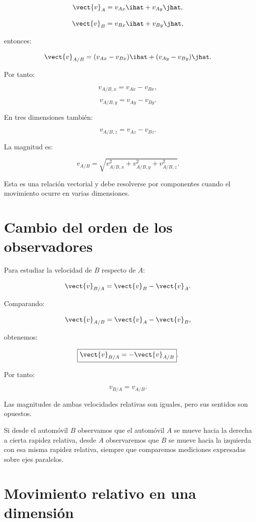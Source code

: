 \[
\vect{v}_A=v_{Ax}\ihat+v_{Ay}\jhat,
\]

\[
\vect{v}_B=v_{Bx}\ihat+v_{By}\jhat,
\]

entonces:

\[
\vect{v}_{A/B}
=
(v_{Ax}-v_{Bx})\ihat
+
(v_{Ay}-v_{By})\jhat.
\]

Por tanto:

\[
\boxed{
v_{A/B,x}=v_{Ax}-v_{Bx}
},
\]

\[
\boxed{
v_{A/B,y}=v_{Ay}-v_{By}
}.
\]

En tres dimensiones también:

\[
\boxed{
v_{A/B,z}=v_{Az}-v_{Bz}
}.
\]

La magnitud es:

\[
\boxed{
v_{A/B}
=
\sqrt{
v_{A/B,x}^2+
v_{A/B,y}^2+
v_{A/B,z}^2
}
}.
\]

Esta es una relación vectorial y debe resolverse por componentes
cuando el movimiento ocurre en varias dimensiones.


\section{Cambio del orden de los observadores}

Para estudiar la velocidad de \(B\) respecto de \(A\):

\[
\vect{v}_{B/A}=\vect{v}_B-\vect{v}_A.
\]

Comparando:

\[
\vect{v}_{A/B}=\vect{v}_A-\vect{v}_B,
\]

obtenemos:

\[
\boxed{
\vect{v}_{B/A}=-\vect{v}_{A/B}
}.
\]

Por tanto:

\[
\boxed{
v_{B/A}=v_{A/B}
}.
\]

Las magnitudes de ambas velocidades relativas son iguales,
pero sus sentidos son opuestos.

\begin{interpretacion}

Si desde el automóvil \(B\) observamos que el automóvil \(A\)
se mueve hacia la derecha a cierta rapidez relativa, desde
\(A\) observaremos que \(B\) se mueve hacia la izquierda
con esa misma rapidez relativa, siempre que comparemos
mediciones expresadas sobre ejes paralelos.

\end{interpretacion}


\section{Movimiento relativo en una dimensión}

